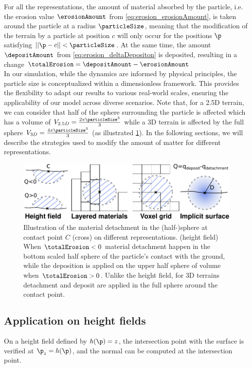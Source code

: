 For all the representations, the amount of material absorbed by the particle, i.e. the erosion value $\erosionAmount$ from \eqref{eq:erosion_erosionAmount}, is taken around the particle at a radius $\particleSize$, meaning that the modification of the terrain by a particle at position $c$ will only occur for the positions $\p$ satisfying $||\p - c|| < \particleSize$. At the same time, the amount $\depositAmount$ from \eqref{eq:erosion_deltaDepositon} is deposited, resulting in a change $\totalErosion = \depositAmount - \erosionAmount$\\ 
In our simulation, while the dynamics are informed by physical principles, the particle size is conceptualized within a dimensionless framework. This provides the flexibility to adapt our results to various real-world scales, ensuring the applicability of our model across diverse scenarios.
Note that, for a 2.5D terrain, we can consider that half of the sphere surrounding the particle is affected which has a volume of $V_{2.5D} = \frac{2 \pi \particleSize^3}{3}$ while a 3D terrain is affected by the full sphere $V_{3D} = \frac{4 \pi \particleSize^3}{3}$ (as illustrated  \cref{fig:erosion_erosion_heightfield}). In the following sections, we will describe the strategies used to modify the amount of matter for different representations. 
\begin{figure}
\centering
\includegraphics{a_erosion_deposition.pdf}
\caption{Illustration of the material detachment in the (half-)sphere at contact point $C$ (cross) on different representations. (height field) When $\totalErosion < 0$ material detachment happen in the bottom scaled half sphere of the particle's contact with the ground, while the deposition is applied on the upper half sphere of volume when $\totalErosion > 0$. Unlike the height field, for 3D terrains detachment and deposit are applied in the full sphere around the contact point.}
\label{fig:erosion_erosion_heightfield}

\end{figure}
\subsection{Application on height fields}
\label{sec:erosion_application_on_heightmaps}
On a height field defined by $h(\p) = z$, the intersection point with the surface is verified at $\p_z = h(\p)$, and the normal can be computed at the intersection point. 

